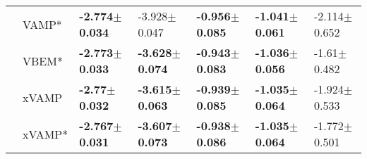 \begin{tabular}{lllllll}
                 & VAMP* &  \textbf{-2.774$\pm$0.034} &           -3.928$\pm$0.047 &  \textbf{-0.956$\pm$0.085} &  \textbf{-1.041$\pm$0.061} &           -2.114$\pm$0.652 \\
                 & VBEM* &  \textbf{-2.773$\pm$0.033} &  \textbf{-3.628$\pm$0.074} &  \textbf{-0.943$\pm$0.083} &  \textbf{-1.036$\pm$0.056} &            -1.61$\pm$0.482 \\
                 & xVAMP &   \textbf{-2.77$\pm$0.032} &  \textbf{-3.615$\pm$0.063} &  \textbf{-0.939$\pm$0.085} &  \textbf{-1.035$\pm$0.064} &           -1.924$\pm$0.533 \\
                 & xVAMP* &  \textbf{-2.767$\pm$0.031} &  \textbf{-3.607$\pm$0.073} &  \textbf{-0.938$\pm$0.086} &  \textbf{-1.035$\pm$0.064} &           -1.772$\pm$0.501 \\
\bottomrule
\end{tabular}

